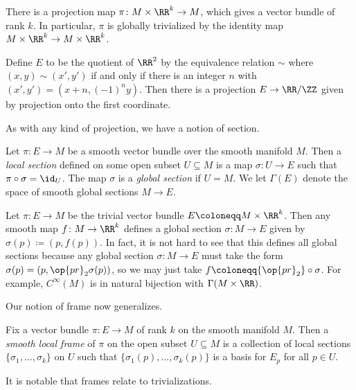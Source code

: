\documentclass[../notes.tex]{subfiles}
\begin{document}
\begin{example}
	There is a projection map $\pi\colon M\times\RR^k\to M$, which gives a vector bundle of rank $k$. In particular, $\pi$ is globally trivialized by the identity map $M\times\RR^k\to M\times\RR^k$.
\end{example}
\begin{example}
	Define $E$ to be the quotient of $\RR^2$ by the equivalence relation $\sim$ where $(x,y)\sim(x',y')$ if and only if there is an integer $n$ with $(x',y')=\left(x+n,(-1)^ny\right)$. Then there is a projection $E\to\RR/\ZZ$ given by projection onto the first coordinate.
\end{example}
As with any kind of projection, we have a notion of section.
\begin{definition}[section]
	Let $\pi\colon E\to M$ be a smooth vector bundle over the smooth manifold $M$. Then a \textit{local section} defined on some open subset $U\subseteq M$ is a map $\sigma\colon U\to E$ such that $\pi\circ\sigma=\id_U$. The map $\sigma$ is a \textit{global section} if $U=M$. We let $\Gamma(E)$ denote the space of smooth global sections $M\to E$.
\end{definition}
\begin{example}
	Let $\pi\colon E\to M$ be the trivial vector bundle $E\coloneqq M\times\RR^k$. Then any smooth map $f\colon M\to\RR^k$ defines a global section $\sigma\colon M\to E$ given by $\sigma(p)\coloneqq(p,f(p))$. In fact, it is not hard to see that this defines all global sections because any global section $\sigma\colon M\to E$ must take the form $\sigma(p)=(p,\op{pr}_2\sigma(p))$, so we may just take $f\coloneqq{\op{pr}_2}\circ\sigma$. For example, $C^\infty(M)$ is in natural bijection with $\Gamma(M\times\RR)$.
\end{example}
Our notion of frame now generalizes.
\begin{definition}[frame]
	Fix a vector bundle $\pi\colon E\to M$ of rank $k$ on the smooth manifold $M$. Then a \textit{smooth local frame} of $\pi$ on the open subset $U\subseteq M$ is a collection of local sections $\{\sigma_1,\ldots,\sigma_k\}$ on $U$ such that $\{\sigma_1(p),\ldots,\sigma_k(p)\}$ is a basis for $E_p$ for all $p\in U$.
\end{definition}
It is notable that frames relate to trivializations.
\end{document}
